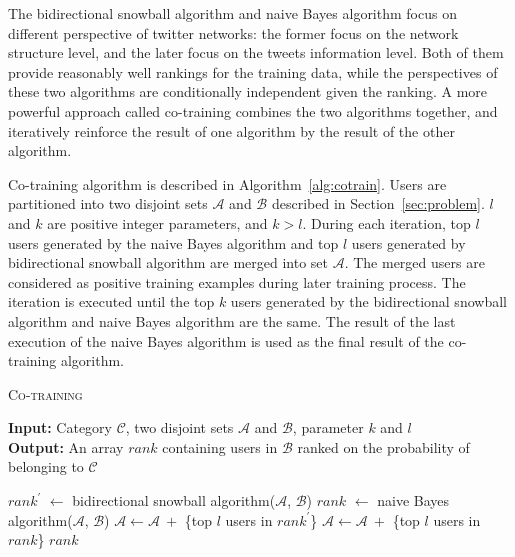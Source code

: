 \documentclass{article}
\begin{document}
The bidirectional snowball algorithm and naive Bayes algorithm focus on different perspective of twitter networks: the former focus on the network structure level, and the later focus on the tweets information level. Both of them provide reasonably well rankings for the training data, while the perspectives of these two algorithms are conditionally independent given the ranking. A more powerful approach called co-training \cite{cotraining} combines the two algorithms together, and iteratively reinforce the result of one algorithm by the result of the other algorithm.


Co-training algorithm is described in Algorithm~\ref{alg:cotrain}. Users are partitioned into two disjoint sets $\mathcal{A}$ and $\mathcal{B}$ described in Section~\ref{sec:problem}. $l$ and $k$ are positive integer parameters, and $k > l$. During each iteration, top $l$ users generated by the naive Bayes algorithm and top $l$ users generated by bidirectional snowball algorithm are merged into set $\mathcal{A}$. The merged users are considered as positive training examples during later training process. The iteration is executed until the top $k$ users generated by the bidirectional snowball algorithm and naive Bayes algorithm are the same. The result of the last execution of the naive Bayes algorithm is used as the final result of the co-training algorithm.

\begin{algorithm}[htbp]
\caption{\textsc{Co-training}}
\textbf{Input: }{Category $\mathcal{C}$, two disjoint sets $\mathcal{A}$ and $\mathcal{B}$, parameter $k$ and $l$}\\
\textbf{Output: }{An array $rank$ containing users in $\mathcal{B}$ ranked on the probability of belonging to $\mathcal{C}$}
\begin{algorithmic}[1]
\REPEAT
\STATE $rank^{\prime}$ $\leftarrow$ bidirectional snowball algorithm($\mathcal{A}$, $\mathcal{B}$)
\STATE $rank$ $\leftarrow$ naive Bayes algorithm($\mathcal{A}$, $\mathcal{B}$)
\STATE $\mathcal{A} \leftarrow \mathcal{A} ~ + $ \{top $l$ users in $rank^{\prime}$\}
\STATE $\mathcal{A} \leftarrow \mathcal{A} ~ + $ \{top $l$ users in $rank$\}
\RETURN $rank$
\end{algorithmic}
\label{alg:cotrain}
\end{algorithm}

\ifx \allfiles \undefined
\end{document}
